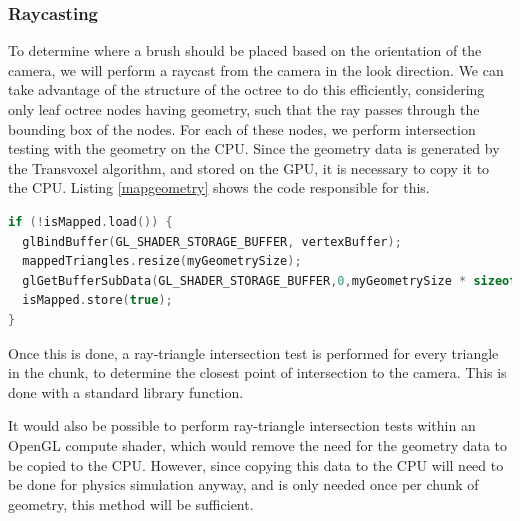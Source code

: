 \documentclass{article}
\begin{document}
\subsubsection{Raycasting}
\label{section:raycasting}
To determine where a brush should be placed based on the orientation of the camera, we will perform a raycast from the camera in the look direction. We can take advantage of the structure of the octree to do this efficiently, considering only leaf octree nodes having geometry, such that the ray passes through the bounding box of the nodes. For each of these nodes, we perform intersection testing with the geometry on the CPU. Since the geometry data is generated by the Transvoxel algorithm, and stored on the GPU, it is necessary to copy it to the CPU. Listing \ref{mapgeometry} shows the code responsible for this.

\begin{lstlisting}[language=C++,label={mapgeometry},caption={Snippet from the procedure \texttt{mapGeometry} to copy geometry data for a chunk from the GPU to the CPU, to be stored in the array \texttt{mappedTriangles}. \texttt{isMapped} is an atomic boolean storing whether \texttt{mapGeometry} has already been called for this chunk.}]
if (!isMapped.load()) {
  glBindBuffer(GL_SHADER_STORAGE_BUFFER, vertexBuffer);
  mappedTriangles.resize(myGeometrySize);
  glGetBufferSubData(GL_SHADER_STORAGE_BUFFER,0,myGeometrySize * sizeof(glm::vec4),mappedTriangles.data());
  isMapped.store(true);
}
\end{lstlisting}

Once this is done, a ray-triangle intersection test is performed for every triangle in the chunk, to determine the closest point of intersection to the camera. This is done with a standard library function. 

It would also be possible to perform ray-triangle intersection tests within an OpenGL compute shader, which would remove the need for the geometry data to be copied to the CPU. However, since copying this data to the CPU will need to be done for physics simulation anyway, and is only needed once per chunk of geometry, this method will be sufficient.
\end{document}
